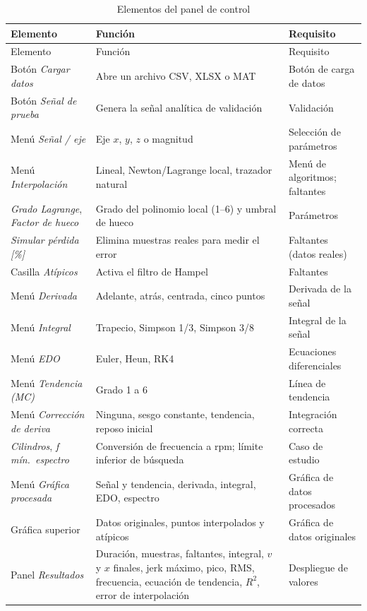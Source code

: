 \begin{longtable}{@{}p{3.8cm}p{6.6cm}p{3.6cm}@{}}
\caption{Elementos del panel de control}\label{tab:panel}\\
\toprule
Elemento & Función & Requisito \\
\midrule
\endfirsthead
\toprule
Elemento & Función & Requisito \\
\midrule
\endhead
\bottomrule
\endfoot
Botón \textit{Cargar datos} & Abre un archivo CSV, XLSX o MAT & Botón de carga de datos \\
Botón \textit{Señal de prueba} & Genera la señal analítica de validación & Validación \\
Menú \textit{Señal / eje} & Eje $x$, $y$, $z$ o magnitud & Selección de parámetros \\
Menú \textit{Interpolación} & Lineal, Newton/Lagrange local, trazador natural & Menú de algoritmos; faltantes \\
\textit{Grado Lagrange}, \textit{Factor de hueco} & Grado del polinomio local (1--6) y umbral de hueco & Parámetros \\
\textit{Simular pérdida [\%]} & Elimina muestras reales para medir el error & Faltantes (datos reales) \\
Casilla \textit{Atípicos} & Activa el filtro de Hampel & Faltantes \\
Menú \textit{Derivada} & Adelante, atrás, centrada, cinco puntos & Derivada de la señal \\
Menú \textit{Integral} & Trapecio, Simpson 1/3, Simpson 3/8 & Integral de la señal \\
Menú \textit{EDO} & Euler, Heun, RK4 & Ecuaciones diferenciales \\
Menú \textit{Tendencia (MC)} & Grado 1 a 6 & Línea de tendencia \\
Menú \textit{Corrección de deriva} & Ninguna, sesgo constante, tendencia, reposo inicial & Integración correcta \\
\textit{Cilindros}, \textit{f mín.\ espectro} & Conversión de frecuencia a rpm; límite inferior de búsqueda & Caso de estudio \\
Menú \textit{Gráfica procesada} & Señal y tendencia, derivada, integral, EDO, espectro & Gráfica de datos procesados \\
Gráfica superior & Datos originales, puntos interpolados y atípicos & Gráfica de datos originales \\
Panel \textit{Resultados} & Duración, muestras, faltantes, integral, $v$ y $x$ finales, jerk máximo, pico, RMS, frecuencia, ecuación de tendencia, $R^2$, error de interpolación & Despliegue de valores \\

\end{longtable}
